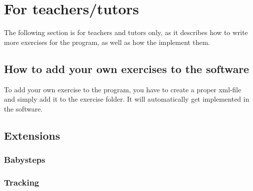 \documentclass[10pt,a4paper]{article}
\begin{document}
\section{For teachers/tutors}
The following section is for teachers and tutors only, as it describes how to write more exercises for the program, as well as how the implement them.
\subsection{How to add your own exercises to the software}
To add your own exercise to the program, you have to create a proper xml-file and simply add it to the exercise folder. It will automatically get implemented in the software.
\subsection{Extensions}

\subsubsection{Babysteps}

\subsubsection{Tracking}
\end{document}
